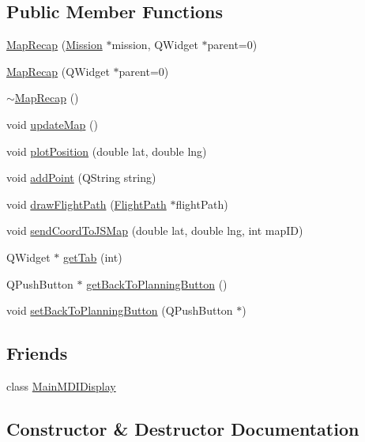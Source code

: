 \subsection*{Public Member Functions}
\begin{DoxyCompactItemize}
\item 
\hyperlink{class_map_recap_a739aa8a008d8daf8ed083edd2af1da56}{Map\+Recap} (\hyperlink{class_mission}{Mission} $\ast$mission, Q\+Widget $\ast$parent=0)
\item 
\hyperlink{class_map_recap_a68734cfee38270d6b61ead2eec0f64a2}{Map\+Recap} (Q\+Widget $\ast$parent=0)
\item 
\hyperlink{class_map_recap_a70449a34a10a0770d0cbbe2f86040852}{$\sim$\+Map\+Recap} ()
\item 
void \hyperlink{class_map_recap_a6fbdfd9a06e6e08b961298197eca389e}{update\+Map} ()
\item 
void \hyperlink{class_map_recap_a669c0d109577996829b6c089b6d7262f}{plot\+Position} (double lat, double lng)
\item 
void \hyperlink{class_map_recap_a52a26d6de1e8003cc1b59e297df96b12}{add\+Point} (Q\+String string)
\item 
void \hyperlink{class_map_recap_a56a47357e83cd6a8d451cd561142259e}{draw\+Flight\+Path} (\hyperlink{class_flight_path}{Flight\+Path} $\ast$flight\+Path)
\item 
void \hyperlink{class_map_recap_aa63a3d553ae9b10f0eeddcf411474b5b}{send\+Coord\+To\+J\+S\+Map} (double lat, double lng, int map\+I\+D)
\item 
Q\+Widget $\ast$ \hyperlink{class_map_recap_a44427cdc30c5bbf4ceffd044052b626f}{get\+Tab} (int)
\item 
Q\+Push\+Button $\ast$ \hyperlink{class_map_recap_a78f083152cc33bd8d5750b6dfb213bff}{get\+Back\+To\+Planning\+Button} ()
\item 
void \hyperlink{class_map_recap_a7211ca6ea807c0bd769ea85c3b6ed10e}{set\+Back\+To\+Planning\+Button} (Q\+Push\+Button $\ast$)
\end{DoxyCompactItemize}
\subsection*{Friends}
\begin{DoxyCompactItemize}
\item 
class \hyperlink{class_map_recap_a337398c114f638b5a3e2fdc4529936c5}{Main\+M\+D\+I\+Display}
\end{DoxyCompactItemize}


\subsection{Constructor \& Destructor Documentation}
\hypertarget{class_map_recap_a739aa8a008d8daf8ed083edd2af1da56}{}
